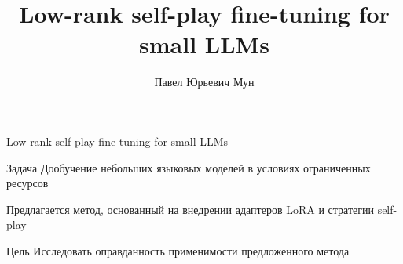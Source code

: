 \documentclass{beamer}
\title[\hbox to 56mm{Low-rank}]{ Low-rank self-play fine-tuning for small LLMs }
\author[П.\,Ю. Мун]{Павел Юрьевич Мун}
\institute{Московский физико-технический институт}
\date{\footnotesize
\par\smallskip\emph{Курс:} Автоматизация научных исследований
\par\smallskip\emph{Эксперт:} А.\,В.~Грабовой
\par\smallskip\emph{Консультант:} Н.\,В.~Охотников
\par\bigskip\small 2025}
\begin{document}
\begin{frame}
\thispagestyle{empty}
\maketitle
\end{frame}
\begin{frame}{Low-rank self-play fine-tuning for small LLMs}

\begin{block}{Задача}
  Дообучение небольших языковых моделей в условиях ограниченных ресурсов
\end{block}
\begin{block}{Предлагается}
  метод, основанный на внедрении адаптеров LoRA и стратегии self-play
\end{block}
\begin{block}{Цель}
  Исследовать оправданность применимости предложенного метода
\end{block}

\end{frame}
\end{document}
